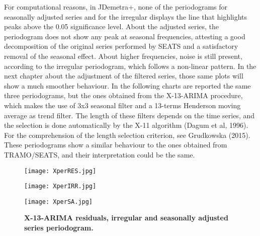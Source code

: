 \documentclass{article}
\begin{document}
For computational reasons, in JDemetra+, none of the periodograms for seasonally adjusted series and for the irregular displays the line that highlights peaks above the 0.05 significance level. About the adjusted series, the periodogram does not show any peak at seasonal frequencies, attesting a good decomposition of the original series performed by SEATS and a satisfactory removal of the seasonal effect. {\color{red}About higher frequencies, noise is still present, according to the irregular periodogram, which follows a non-linear pattern.} In the next chapter about the adjustment of the filtered series, those same plots will show a much smoother behaviour. In the following charts are reported the same three periodograms, but the ones obtained from the X-13-ARIMA procedure, which makes the use of 3x3 seasonal filter and a 13-terms Henderson moving average as trend filter. The length of these filters depends on the time series, and the selection is done automatically by the X-11 algorithm (Dagum et al, 1996). For the comprehension of the length selection criterion, see Grudkowska (2015). These periodograms show a similar behaviour to the ones obtained from TRAMO/SEATS, and their interpretation could be the same. 
\begin{figure}[H]
  \texttt{[image: XperRES.jpg]} 
  \label{fig:1}
\end{figure}
\begin{figure}[H]
  \texttt{[image: XperIRR.jpg]} 
  \label{fig:1}
\end{figure}
\begin{figure}[H]
  \texttt{[image: XperSA.jpg]} 
   \caption{\textbf{\footnotesize X-13-ARIMA residuals, irregular and seasonally adjusted series periodogram. }}
  \label{fig:1}
\end{figure}
\end{document}
